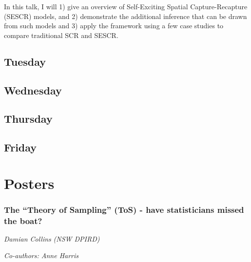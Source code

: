 \documentclass[
]{scrreprt}
\begin{document}
In this talk, I will 1) give an overview of Self-Exciting Spatial
Capture-Recapture (SESCR) models, and 2) demonstrate the additional
inference that can be drawn from such models and 3) apply the framework
using a few case studies to compare traditional SCR and SESCR.

\section{Tuesday}\label{tuesday}

\section{Wednesday}\label{wednesday}

\section{Thursday}\label{thursday}

\section{Friday}\label{friday}

\chapter{Posters}\label{posters}

\subsection{The ``Theory of Sampling'' (ToS) - have statisticians missed
the
boat?}\label{the-theory-of-sampling-tos---have-statisticians-missed-the-boat}

\emph{Damian Collins} \emph{(NSW DPIRD)}

\emph{Co-authors: Anne Harris}

\setlength{\parskip}{0.5em}
\end{document}
